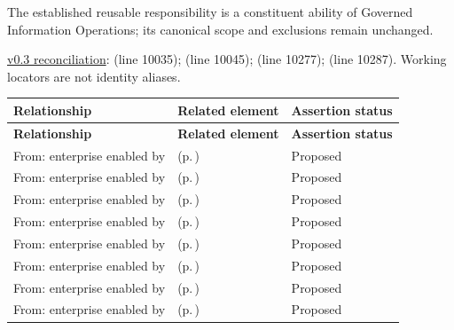 The established reusable responsibility is a constituent ability of Governed Information Operations; its canonical scope and exclusions remain unchanged.


\hyperref[model:reconciliation]{v0.3 reconciliation}: \texttt{} (line 10035); \texttt{} (line 10045); \texttt{} (line 10277); \texttt{} (line 10287). Working locators are not identity aliases.
\begingroup\small\setlength{\TableWidth}{\dimexpr\linewidth-6\tabcolsep-4\arrayrulewidth\relax}
\begin{longtable}{|>{\raggedright\arraybackslash}p{0.27\TableWidth}|>{\raggedright\arraybackslash}p{0.48\TableWidth}|>{\raggedright\arraybackslash}p{0.25\TableWidth}|}
\hline\rowcolor{TableHead}\textbf{Relationship} & \textbf{Related element} & \textbf{Assertion status}\\\hline\endfirsthead
\hline\rowcolor{TableHead}\textbf{Relationship} & \textbf{Related element} & \textbf{Assertion status}\\\hline\endhead
\hline\endfoot
From: enterprise enabled by & \nameref{cap:bec-person-identity} (p.\,\pageref{cap:bec-person-identity}) & Proposed\\\hline
From: enterprise enabled by & \nameref{cap:bec-healthcare-subject} (p.\,\pageref{cap:bec-healthcare-subject}) & Proposed\\\hline
From: enterprise enabled by & \nameref{cap:bec-provider-administration} (p.\,\pageref{cap:bec-provider-administration}) & Proposed\\\hline
From: enterprise enabled by & \nameref{cap:bec-organisation-administration} (p.\,\pageref{cap:bec-organisation-administration}) & Proposed\\\hline
From: enterprise enabled by & \nameref{cap:bec-location-administration} (p.\,\pageref{cap:bec-location-administration}) & Proposed\\\hline
From: enterprise enabled by & \nameref{cap:bec-health-service-administration} (p.\,\pageref{cap:bec-health-service-administration}) & Proposed\\\hline
From: enterprise enabled by & \nameref{cap:bec-clinical-device-administration} (p.\,\pageref{cap:bec-clinical-device-administration}) & Proposed\\\hline
From: enterprise enabled by & \nameref{cap:bec-referral-administration} (p.\,\pageref{cap:bec-referral-administration}) & Proposed\\\hline

\end{longtable}
